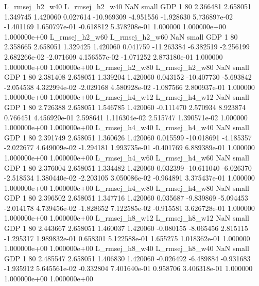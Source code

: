L_rmsej_h2_w40 L_rmsej_h2_w40                   NaN      small      GDP                 1 80 2.366481       2.658051 1.349745       1.420060    0.027614    -10.969309     -4.951556    -1.928630   5.736897e-02 -1.401169 1.650797e-01    -0.618812   5.378208e-01            1.000000    1.000000e+00        1.000000e+00
L_rmsej_h2_w60 L_rmsej_h2_w60                   NaN      small      GDP                 1 80 2.358665       2.658051 1.329425       1.420060    0.041759    -11.263384     -6.382519    -2.256199   2.682266e-02 -2.071609 4.156557e-02    -1.071252   2.873180e-01            1.000000    1.000000e+00        1.000000e+00
L_rmsej_h2_w80 L_rmsej_h2_w80                   NaN      small      GDP                 1 80 2.381408       2.658051 1.339204       1.420060    0.043152    -10.407730     -5.693842    -2.054538   4.322994e-02 -2.029168 4.580928e-02    -1.087566   2.800937e-01            1.000000    1.000000e+00        1.000000e+00
L_rmsej_h4_w12 L_rmsej_h4_w12                   NaN      small      GDP                 1 80 2.726388       2.658051 1.546785       1.420060   -0.111470      2.570934      8.923874     0.766451   4.456920e-01  2.598641 1.116304e-02     2.515747   1.390571e-02            1.000000    1.000000e+00        1.000000e+00
L_rmsej_h4_w40 L_rmsej_h4_w40                   NaN      small      GDP                 1 80 2.391749       2.658051 1.360626       1.420060    0.015599    -10.018691     -4.185357    -2.022677   4.649009e-02 -1.294181 1.993735e-01    -0.401769   6.889389e-01            1.000000    1.000000e+00        1.000000e+00
L_rmsej_h4_w60 L_rmsej_h4_w60                   NaN      small      GDP                 1 80 2.376004       2.658051 1.334482       1.420060    0.032399    -10.611040     -6.026370    -2.518534   1.380440e-02 -2.203105 3.050086e-02    -0.964891   3.375437e-01            1.000000    1.000000e+00        1.000000e+00
L_rmsej_h4_w80 L_rmsej_h4_w80                   NaN      small      GDP                 1 80 2.396502       2.658051 1.347716       1.420060    0.035687     -9.839869     -5.094453    -2.014178   4.739456e-02 -1.828652 7.122585e-02    -0.915581   3.626728e-01            1.000000    1.000000e+00        1.000000e+00
L_rmsej_h8_w12 L_rmsej_h8_w12                   NaN      small      GDP                 1 80 2.443667       2.658051 1.460037       1.420060   -0.080155     -8.065456      2.815115    -1.295317   1.989832e-01  0.658301 5.122588e-01     1.655275   1.018362e-01            1.000000    1.000000e+00        1.000000e+00
L_rmsej_h8_w40 L_rmsej_h8_w40                   NaN      small      GDP                 1 80 2.485547       2.658051 1.406830       1.420060   -0.026492     -6.489884     -0.931683    -1.935912   5.645561e-02 -0.332804 7.401640e-01     0.958706   3.406318e-01            1.000000    1.000000e+00        1.000000e+00
